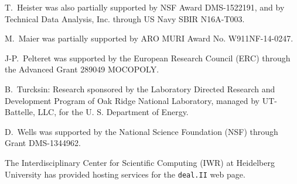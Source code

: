 \documentclass{ansarticle-preprint}
\newcommand{\specialword}[1]{\texttt{#1}}
\newcommand{\dealii}{{\specialword{deal.II}}\xspace}
\begin{document}
T.~Heister was also partially supported by NSF Award DMS-1522191, and
by Technical Data Analysis, Inc. through US Navy SBIR N16A-T003.

M.~Maier was partially supported by ARO MURI Award No. W911NF-14-0247.

J-P.~Pelteret was supported by the European Research Council (ERC) through
the Advanced Grant 289049 MOCOPOLY.

B.~Turcksin: Research sponsored by the Laboratory Directed Research and
Development Program of Oak Ridge National Laboratory, managed by UT-Battelle,
LLC, for the U. S. Department of Energy.

D.~Wells was supported by the National Science Foundation (NSF) through Grant
DMS-1344962.

The Interdisciplinary Center for Scientific Computing (IWR) at Heidelberg
University has provided hosting services for the \dealii web page.


{}

\end{document}
